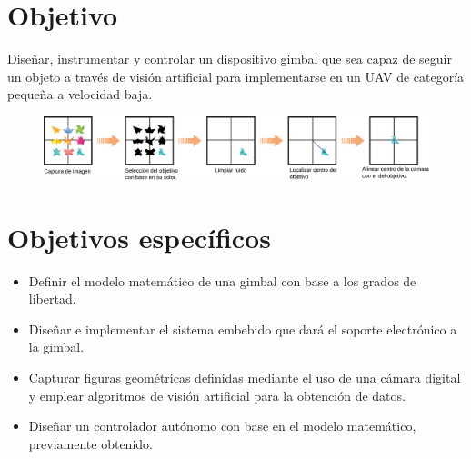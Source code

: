 \section{Objetivo}
Diseñar, instrumentar y controlar un dispositivo gimbal que sea capaz de seguir un objeto a través de visión artificial para
implementarse en un UAV de categoría pequeña a velocidad baja.
\begin{figure}[htb]
	\centering
	\includegraphics[width=1\textwidth]{Contenido/Cuerpo/Capitulo1/Fig0.eps}
	\label{fig:Introduccion:Fig1}
\end{figure}

\section{Objetivos específicos}
\begin{itemize}
	\item Definir el modelo matemático de una gimbal con base a los grados de libertad.
	\item Diseñar e implementar el sistema embebido que dará el soporte electrónico a la gimbal.
	\item Capturar figuras geométricas definidas  mediante el uso de una cámara digital y emplear algoritmos de visión artificial para la obtención de datos.
	\item Diseñar un controlador autónomo con base en el modelo matemático, previamente obtenido.
\end{itemize}

